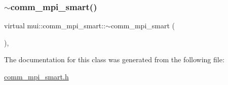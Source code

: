 \subsubsection{\texorpdfstring{$\sim$comm\+\_\+mpi\+\_\+smart()}{~comm\_mpi\_smart()}}
{\footnotesize\ttfamily virtual mui\+::comm\+\_\+mpi\+\_\+smart\+::$\sim$comm\+\_\+mpi\+\_\+smart (\begin{DoxyParamCaption}{ }\end{DoxyParamCaption})\hspace{0.3cm}{\ttfamily [inline]}, {\ttfamily [virtual]}}



The documentation for this class was generated from the following file\+:\begin{DoxyCompactItemize}
\item 
\hyperlink{comm__mpi__smart_8h}{comm\+\_\+mpi\+\_\+smart.\+h}\end{DoxyCompactItemize}
